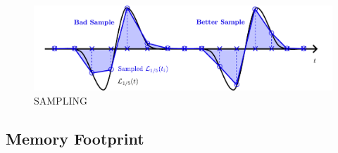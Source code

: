 \begin{figure}[t]
\centering
\includegraphics[scale=0.65]{assets/imgs/wave-sampling-comparison.pdf}
\caption{SAMPLING}
\label{fig:wave-sampling}
\end{figure}





\subsection{Memory Footprint}


